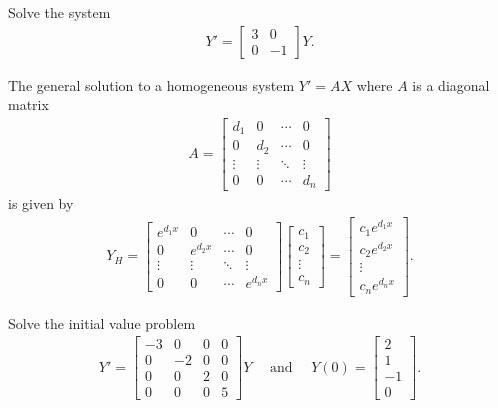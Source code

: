 \documentclass[12pt,a4paper]{article}
\newcounter{example}[section]
\begin{document}
	\begin{example}
	Solve the system
		\begin{align*}
		Y' = \begin{bmatrix}
		3 & 0 \\ 0 & -1
		\end{bmatrix} Y .
		\end{align*}
	\end{example}
	
\newpage

The general solution to a homogeneous system $Y' = AX$ where $A$ is a diagonal matrix
	\begin{align*}
	A = \begin{bmatrix}
	d_1 & 0 & \cdots & 0 \\
	0 & d_2 & \cdots & 0 \\
	\vdots & \vdots & \ddots & \vdots \\
	0 & 0 & \cdots & d_n
	\end{bmatrix}
	\end{align*} 
is given by
	\begin{align*}
	Y_H = \begin{bmatrix}
	e^{d_1x} & 0 & \cdots & 0 \\
	0 & e^{d_2x} & \cdots & 0 \\
	\vdots & \vdots & \ddots & \vdots \\
	0 & 0 & \cdots & e^{d_n x}
	\end{bmatrix} \begin{bmatrix}
	c_1 \\ c_2 \\ \vdots \\ c_n
	\end{bmatrix} = \begin{bmatrix}
	c_1 e^{d_1 x} \\ c_2 e^{d_2x} \\ \vdots \\ c_n e^{d_n x}
	\end{bmatrix} .
	\end{align*}
	
	\begin{example}
	Solve the initial value problem
		\begin{align*}
		Y' = \begin{bmatrix} 
		-3 & 0 & 0 & 0 \\
		0 & -2 & 0 & 0 \\
		0 & 0 & 2 & 0 \\
		0 & 0 & 0 & 5 
		\end{bmatrix} Y \quad \text{ and } \quad 
		Y (0) = \begin{bmatrix}
		2 \\ 1 \\ -1 \\ 0
		\end{bmatrix} .
		\end{align*}
	\end{example}
	
\end{document}
